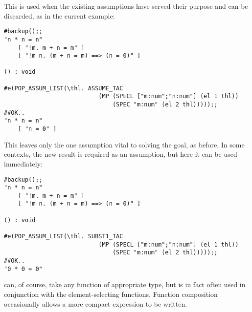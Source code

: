\noindent This is used when the existing assumptions have served
their purpose and can be discarded, as in the current example:

\begin{session}\begin{verbatim}
#backup();;
"n * n = n"
    [ "!m. m + n = m" ]
    [ "!m n. (m + n = m) ==> (n = 0)" ]

() : void

#e(POP_ASSUM_LIST(\thl. ASSUME_TAC
                           (MP (SPECL ["m:num";"n:num"] (el 1 thl))
                               (SPEC "m:num" (el 2 thl)))));;
##OK..
"n * n = n"
    [ "n = 0" ]
\end{verbatim}\end{session}

\noindent This leaves only the one assumption vital to solving the goal,
as before. In some contexts, the new result is required as an assumption,
but here it can be used immediately:

\begin{session}\begin{verbatim}
#backup();;
"n * n = n"
    [ "!m. m + n = m" ]
    [ "!m n. (m + n = m) ==> (n = 0)" ]

() : void

#e(POP_ASSUM_LIST(\thl. SUBST1_TAC
                           (MP (SPECL ["m:num";"n:num"] (el 1 thl))
                               (SPEC "m:num" (el 2 thl)))));;
##OK..
"0 * 0 = 0"
\end{verbatim}\end{session}

\noindent {} can, of course,
take any function of appropriate
type, but is in fact often used in conjunction with the element-selecting
functions. Function composition occasionally allows a more
compact expression to be written.

